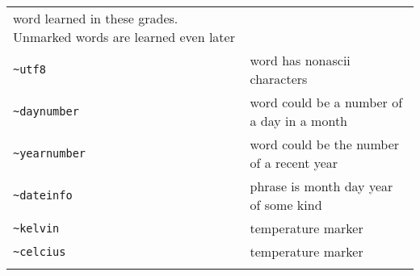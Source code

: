 \documentclass[]{article}
\begin{document}
\begin{longtable}[]{@{}ll@{}}
\begin{minipage}[t]{0.41\columnwidth}
word learned in these grades. Unmarked words are learned even
later\strut
\end{minipage}\tabularnewline
\begin{minipage}[t]{0.22\columnwidth}\raggedright\strut
\texttt{\textasciitilde{}utf8}\strut
\end{minipage} & \begin{minipage}[t]{0.41\columnwidth}\raggedright\strut
word has nonascii characters\strut
\end{minipage}\tabularnewline
\begin{minipage}[t]{0.22\columnwidth}\raggedright\strut
\texttt{\textasciitilde{}daynumber}\strut
\end{minipage} & \begin{minipage}[t]{0.41\columnwidth}\raggedright\strut
word could be a number of a day in a month\strut
\end{minipage}\tabularnewline
\begin{minipage}[t]{0.22\columnwidth}\raggedright\strut
\texttt{\textasciitilde{}yearnumber}\strut
\end{minipage} & \begin{minipage}[t]{0.41\columnwidth}\raggedright\strut
word could be the number of a recent year\strut
\end{minipage}\tabularnewline
\begin{minipage}[t]{0.22\columnwidth}\raggedright\strut
\texttt{\textasciitilde{}dateinfo}\strut
\end{minipage} & \begin{minipage}[t]{0.41\columnwidth}\raggedright\strut
phrase is month day year of some kind\strut
\end{minipage}\tabularnewline
\begin{minipage}[t]{0.22\columnwidth}\raggedright\strut
\texttt{\textasciitilde{}kelvin}\strut
\end{minipage} & \begin{minipage}[t]{0.41\columnwidth}\raggedright\strut
temperature marker\strut
\end{minipage}\tabularnewline
\begin{minipage}[t]{0.22\columnwidth}\raggedright\strut
\texttt{\textasciitilde{}celcius}\strut
\end{minipage} & \begin{minipage}[t]{0.41\columnwidth}\raggedright\strut
temperature marker\strut
\end{minipage}\tabularnewline
\begin{minipage}[t]{0.22\columnwidth}\raggedright\strut

\end{minipage}
\end{longtable}
\end{document}
